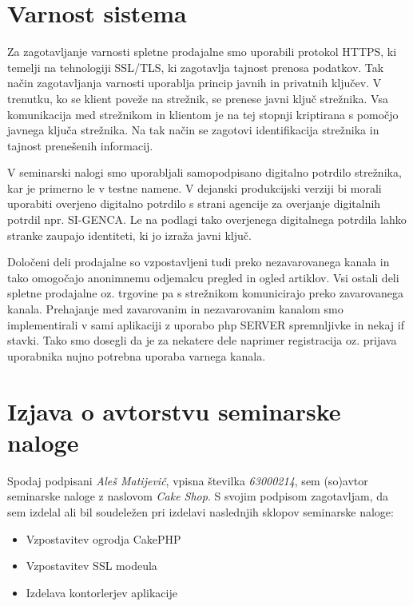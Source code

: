 \documentclass[a4paper,12pt]{report}
\newcommand{\naslov}     {Cake Shop}
\newcommand{\prviavtor}  {Aleš Matijevič}
\newcommand{\prviindeks} {63000214}
\begin{document}
\chapter{Varnost sistema}


Za zagotavljanje varnosti spletne prodajalne smo uporabili protokol HTTPS, ki temelji na tehnologiji SSL/TLS, ki zagotavlja tajnost prenosa podatkov. Tak način zagotavljanja varnosti uporablja princip javnih in privatnih ključev. V trenutku, ko se klient poveže na strežnik, se prenese javni ključ strežnika. Vsa komunikacija med strežnikom in klientom je na tej stopnji kriptirana s pomočjo javnega ključa strežnika. Na tak način se zagotovi identifikacija strežnika in tajnost prenešenih informacij. 

V seminarski nalogi smo uporabljali samopodpisano digitalno potrdilo strežnika, kar je primerno le v testne namene. V dejanski produkcijski verziji bi morali uporabiti overjeno digitalno potrdilo s strani agencije za overjanje digitalnih potrdil npr. SI-GENCA. Le na podlagi tako overjenega digitalnega potrdila lahko stranke zaupajo identiteti, ki jo izraža javni ključ.       

Določeni deli prodajalne so vzpostavljeni tudi preko nezavarovanega kanala in tako omogočajo anonimnemu odjemalcu pregled in ogled artiklov. Vsi ostali deli spletne prodajalne oz. trgovine pa s strežnikom komunicirajo preko zavarovanega kanala. Prehajanje med zavarovanim in nezavarovanim kanalom smo implementirali v sami aplikaciji z uporabo php SERVER spremnljivke in nekaj if stavki. Tako smo dosegli da je za nekatere dele naprimer registracija oz. prijava uporabnika nujno potrebna uporaba varnega kanala.

\chapter{Izjava o avtorstvu seminarske naloge}

Spodaj podpisani \textit{\prviavtor}, vpisna številka \textit{\prviindeks}, sem (so)avtor seminarske naloge z naslovom \textit{\naslov}. S svojim podpisom zagotavljam, da sem izdelal ali bil soudeležen pri izdelavi naslednjih sklopov seminarske naloge:
\begin{itemize}
    \item Vzpostavitev ogrodja CakePHP
	\item Vzpostavitev SSL modeula
	\item Izdelava kontorlerjev aplikacije
\end{itemize}
\end{document}
